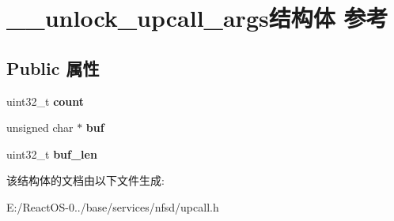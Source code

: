 \hypertarget{struct____unlock__upcall__args}{}\section{\+\_\+\+\_\+unlock\+\_\+upcall\+\_\+args结构体 参考}
\label{struct____unlock__upcall__args}
\subsection*{Public 属性}
\begin{DoxyCompactItemize}
\item 
\mbox{\label{struct____unlock__upcall__args_a0dd00025398834648d91ad2a84d9b23e}} 
uint32\+\_\+t {\bfseries count}
\item 
\mbox{\label{struct____unlock__upcall__args_ab8f5058e66f229abf3754cd4588e370c}} 
unsigned char $\ast$ {\bfseries buf}
\item 
\mbox{\label{struct____unlock__upcall__args_a89d461e25aa575f6e0cb18cbb692751b}} 
uint32\+\_\+t {\bfseries buf\+\_\+len}
\end{DoxyCompactItemize}


该结构体的文档由以下文件生成\+:\begin{DoxyCompactItemize}
\item 
E\+:/\+React\+O\+S-\/0../base/services/nfsd/upcall.\+h\end{DoxyCompactItemize}
